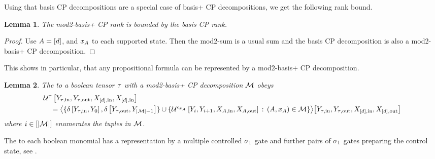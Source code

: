 \documentclass[aps,onecolumn,nofootinbib,pra]{article}
\newtheorem{lemma}{Lemma}
\begin{document}
    Using that basis CP decompositions are a special case of basis+ CP decompositions, we get the following rank bound.

    \begin{lemma}
        The mod2-basis+ CP rank is bounded by the basis CP rank.
    \end{lemma}
    \begin{proof}
        Use $A=[d]$, and $x_{A}$ to each supported state.
        Then the mod2-sum is a usual sum and the basis CP decomposition is also a mod2-basis+ CP decomposition.
    \end{proof}

    This shows in particular, that any propositional formula can be represented by a mod2-basis+ CP decomposition.

    \begin{lemma}
        The \computationCircuit{} to a boolean tensor $\tau$ with a mod2-basis+ CP decomposition $\mathcal{M}$ obeys
        \begin{align*}
            &\mathcal{U}^{\tau}\left[
                Y_{\tau,\mathrm{in}},Y_{\tau,\mathrm{out}},X_{[d],\mathrm{in}},X_{[d],\mathrm{in}}
            \right] \\
            & \quad =
            \big\langle 
                \{\delta\left[Y_{\tau,\mathrm{in}},Y_{0}\right],\delta\left[Y_{\tau,\mathrm{out}},Y_{\left|\mathcal{M}\right|-1}\right]\} \cup
                \{\mathcal{U}^{\epsilon_{x_{A}}}\left[
                    Y_{i}, Y_{i+1},
                    X_{A,\mathrm{in}},X_{A,\mathrm{out}}\right] \,:\, (A,x_{A})\in\mathcal{M}\}
             \big\rangle \big[ Y_{\tau,\mathrm{in}},Y_{\tau,\mathrm{out}},X_{[d],\mathrm{in}},X_{[d],\mathrm{out}} \big]
        \end{align*}
        where $i\in[\left|\mathcal{M}\right|]$ enumerates the tuples in $\mathcal{M}$.
    \end{lemma}

    The \computationCircuit{} to each boolean monomial has a representation by a multiple controlled $\sigma_1$ gate and further pairs of $\sigma_1$ gates preparing the control state, see .
\end{document}
